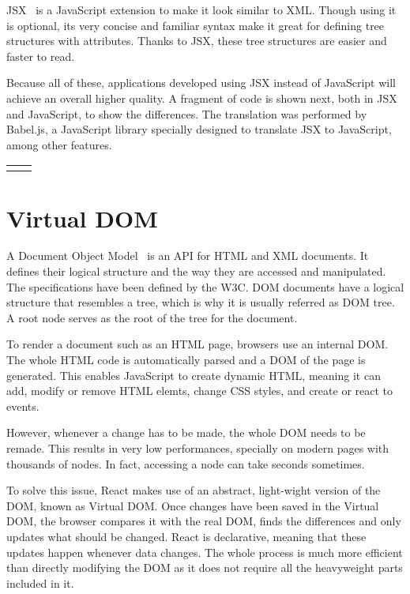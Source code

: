 JSX~\cite{jsx} is a JavaScript extension to make it look similar to XML. Though using it is optional, its very concise and familiar syntax make it great for defining tree structures with attributes. Thanks to JSX, these tree structures are easier and faster to read.

Because all of these, applications developed using JSX instead of JavaScript will achieve an overall higher quality. A fragment of code is shown next, both in JSX and JavaScript, to show the differences. The translation was performed by Babel.js, a JavaScript library specially designed to translate JSX to JavaScript, among other features.

\lstset{style=myhtml,linewidth=7cm}

\begin{table}[H]
\centering
\label{comptable1}
\begin{tabularx}{15cm}{XX}
 & 
\end{tabularx}
\end{table}

\section{Virtual DOM}

A Document Object Model~\cite{dom} is an API for HTML and XML documents. It defines their logical structure and the way they are accessed and manipulated. The specifications have been defined by the W3C. DOM documents have a logical structure that resembles a tree, which is why it is usually referred as DOM tree. A root node serves as the root of the tree for the document.

To render a document such as an HTML page, browsers use an internal DOM. The whole HTML code is automatically parsed and a DOM of the page is generated. This enables JavaScript to create dynamic HTML, meaning it can add, modify or remove HTML elemts, change CSS styles, and create or react to events.

However, whenever a change has to be made, the whole DOM needs to be remade. This results in very low performances, specially on modern pages with thousands of nodes. In fact, accessing a node can take seconds sometimes.

To solve this issue, React makes use of an abstract, light-wight version of the DOM, known as Virtual DOM. Once changes have been saved in the Virtual DOM, the browser compares it with the real DOM, finds the differences and only updates what should be changed. React is declarative, meaning that these updates happen whenever data changes. The whole process is much more efficient than directly modifying the DOM as it does not require all the heavyweight parts included in it.

